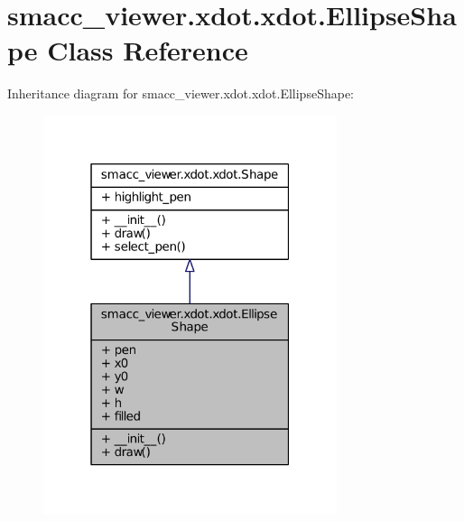 \hypertarget{classsmacc__viewer_1_1xdot_1_1xdot_1_1EllipseShape}{}\section{smacc\+\_\+viewer.\+xdot.\+xdot.\+Ellipse\+Shape Class Reference}
\label{classsmacc__viewer_1_1xdot_1_1xdot_1_1EllipseShape}


Inheritance diagram for smacc\+\_\+viewer.\+xdot.\+xdot.\+Ellipse\+Shape\+:
\nopagebreak
\begin{figure}[H]
\begin{center}
\leavevmode
\includegraphics[width=244pt]{classsmacc__viewer_1_1xdot_1_1xdot_1_1EllipseShape__inherit__graph}
\end{center}
\end{figure}


